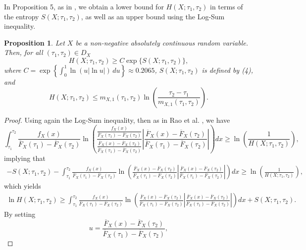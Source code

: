 \documentclass[11pt]{article}
\newtheorem{proposition}{Proposition}
\begin{document}
In Proposition 5, as in \cite{Rao2004}, we obtain a lower bound for $H(X;\tau_1,\tau_2)$ in terms of the entropy $S(X;\tau_1,\tau_2)$, as well as an upper bound using the Log-Sum inequality. 

 
\begin{proposition}
	Let $X$ be a non-negative absolutely continuous random variable. Then, for all $(\tau_1,\tau_2)\in D_X$
	$$ \textstyle H(X;\tau_1,\tau_2 )\geq C\exp\{S(X;\tau_1,\tau_2 )\}, $$
	where $C=\exp\left\{\int_0^1 \ln(u|\ln u|)\,du\right\}\approx 0.2065$, $S(X;\tau_1,\tau_2 )$ is defined by (4), and
	$$ H(X;\tau_1,\tau_2 )\leq m_{X,1}(\tau_1,\tau_2 )\ln\left(\frac{\tau_2-\tau_1}{m_{X,1}(\tau_1,\tau_2 )}\right). $$
\end{proposition}

\begin{proof} 
	Using again the Log-Sum inequality, then as in Rao et al. \cite{Rao2004}, we have
	\begin{equation*}
		\textstyle \int_{\tau_1}^{\tau_2} \frac{f_X(x)}{\overline{F}_X(\tau_1)-\overline{F}_X(\tau_2)} \ln\left(\frac{\frac{f_X(x)}{\overline{F}_X(\tau_1)-\overline{F}_X(\tau_2)}}{\frac{\overline{F}_X(x)-\overline{F}_X(\tau_2)}{\overline{F}_X(\tau_1)-\overline{F}_X(\tau_2)}} \left| \frac{\overline{F}_X(x)-\overline{F}_X(\tau_2)}{\overline{F}_X(\tau_1)-\overline{F}_X(\tau_2)} \right| \right)dx \geq \ln\left(\frac{1}{H(X;\tau_1,\tau_2 )}\right),
	\end{equation*}
	implying that
	\begin{align*}
		\textstyle -S(X;\tau_1,\tau_2 ) - \int_{\tau_1}^{\tau_2} \frac{f_X(x)}{\overline{F}_X(\tau_1)-\overline{F}_X(\tau_2)} \ln\left( \frac{\overline{F}_X(x)-\overline{F}_X(\tau_2)}{\overline{F}_X(\tau_1)-\overline{F}_X(\tau_2)} \left| \frac{\overline{F}_X(x)-\overline{F}_X(\tau_2)}{\overline{F}_X(\tau_1)-\overline{F}_X(\tau_2)} \right| \right)dx \geq \ln\left(\frac{1}{H(X;\tau_1,\tau_2 )}\right),
	\end{align*}
	which yields
	\begin{align*}
		\textstyle \ln H(X;\tau_1,\tau_2 ) \geq \int_{\tau_1}^{\tau_2} \frac{f_X(x)}{\overline{F}_X(\tau_1)-\overline{F}_X(\tau_2)} \ln\left( \frac{\overline{F}_X(x)-\overline{F}_X(\tau_2)}{\overline{F}_X(\tau_1)-\overline{F}_X(\tau_2)} \left| \frac{\overline{F}_X(x)-\overline{F}_X(\tau_2)}{\overline{F}_X(\tau_1)-\overline{F}_X(\tau_2)} \right| \right)dx + S(X;\tau_1,\tau_2 ).
	\end{align*}
	By setting
	$$ \textstyle u = \frac{\overline{F}_X(x)-\overline{F}_X(\tau_2)}{\overline{F}_X(\tau_1)-\overline{F}_X(\tau_2)}, $$

\end{proof}
\end{document}
